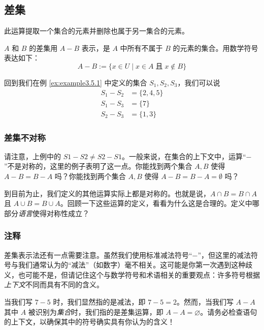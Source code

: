 \subsection{差集}

此运算提取一个集合的元素并删除也属于另一集合的元素。

\begin{definition}
    $A$ 和 $B$ 的差集用 $A - B$ 表示，是 $A$ 中所有不属于 $B$ 的元素的集合。用数学符号表达如下：
    \[A - B := \{x \in U \mid x \in A \;\text{且}\; x \notin B\}\]
\end{definition}

\begin{example}
    回到我们在例 \ref{ex:example3.5.1} 中定义的集合 $S_1, S_2, S_3$，我们可以说
    \begin{align*}
        S_1 - S_2 &= \{2, 4, 5\} \\
        S_1 - S_3 &= \{7\} \\
        S_2 - S_3 &= \{1,3\}
    \end{align*}
\end{example}

\subsubsection*{差集不对称}

请注意，上例中的 $S1 - S2 \ne S2 - S1$。一般来说，在集合的上下文中，运算``$-$''不是对称的，这里的例子表明了这一点。你能找到两个集合 $A, B$ 使得 $A - B = B - A$ 吗？你能找到两个集合 $A, B$ 使得 $A - B = B - A = ∅$ 吗？

到目前为止，我们定义的其他运算实际上都是对称的。也就是说，$A \cap B = B \cap A$ 且 $A \cup B = B \cup A$。回顾一下这些运算的定义，看看为什么这是合理的。定义中哪部分\emph{语言}使得对称性成立？

\subsubsection*{注释}

差集表示法还有一点需要注意。虽然我们使用标准减法符号``$-$''，但这里的减法符号与我们通常认为的``减法''（如数字）毫不相关。这可能是你第一次遇到这种歧义，也可能不是，但请记住这个与数学符号和术语相关的重要观点：许多符号根据\emph{上下文}不同而具有不同的含义。

当我们写 $7 - 5$ 时，我们显然指的是减法，即 $7 - 5 = 2$。然而，当我们写 $A - A$ 其中 $A$ 被识别为\emph{集合}时，我们指的是差集运算，即 $A - A = \varnothing$。请务必检查语句的上下文，以确保其中的符号确实具有你认为的含义！

